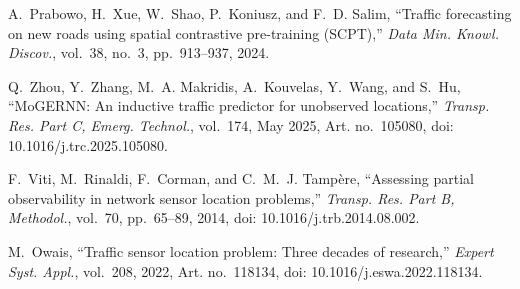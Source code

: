 A.~Prabowo, H.~Xue, W.~Shao, P.~Koniusz, and F.~D. Salim, ``Traffic forecasting on new roads using spatial contrastive pre-training (SCPT),'' \emph{Data Min. Knowl. Discov.}, vol.~38, no.~3, pp.~913--937, 2024.

Q.~Zhou, Y.~Zhang, M.~A. Makridis, A.~Kouvelas, Y.~Wang, and S.~Hu, ``MoGERNN: An inductive traffic predictor for unobserved locations,'' \emph{Transp. Res. Part C, Emerg. Technol.}, vol.~174, May 2025, Art. no.~105080, doi: 10.1016/j.trc.2025.105080.

F.~Viti, M.~Rinaldi, F.~Corman, and C.~M.~J. Tamp\`ere, ``Assessing partial observability in network sensor location problems,'' \emph{Transp. Res. Part B, Methodol.}, vol.~70, pp.~65--89, 2014, doi: 10.1016/j.trb.2014.08.002.

M.~Owais, ``Traffic sensor location problem: Three decades of research,'' \emph{Expert Syst. Appl.}, vol.~208, 2022, Art. no.~118134, doi: 10.1016/j.eswa.2022.118134.

